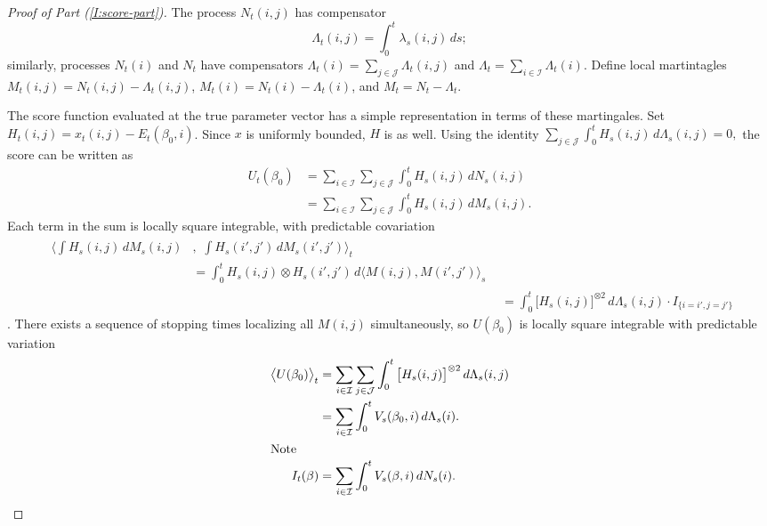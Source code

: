 \documentclass[aoas,preprint]{imsart}
\begin{document}
\begin{proof}[Proof of Part \textit{(\ref{I:score-part})}]
The process $N_t(i,j)$ has compensator
\begin{equation}
    \Lambda_t(i,j)
        =
            \int_0^t \lambda_s(i,j) \, ds;
\end{equation}
similarly, processes $N_t(i)$ and $N_t$ have compensators
$\Lambda_t(i) = \sum_{j \in \mathcal{J}} \Lambda_t(i,j)$
and $\Lambda_t = \sum_{i \in \mathcal{I}} \Lambda_t(i)$.  Define local
martintagles $M_t(i,j) = N_t(i,j) - \Lambda_t(i,j)$,
$M_t(i) = N_t(i) - \Lambda_t(i)$, and 
$M_t = N_t - \Lambda_t$.  

The score function evaluated at the true parameter vector has a simple
representation in terms of these martingales.  Set
$H_t(i,j) = x_t(i,j) - E_t(\beta_0,i)$.  Since $x$ is uniformly
bounded, $H$ is as well.  Using the identity
\(
    \sum_{j \in \mathcal{J}}
    \int_0^t
        H_s(i,j) \,
        d\Lambda_s(i,j)
    =
    0,
\)
the score can be written as
\begin{align*}
    U_t(\beta_0)
        &=
        \sum_{i \in \mathcal{I}}
        \sum_{j \in \mathcal{J}}
        \int_0^t
            H_s(i,j) \, dN_s(i,j) \\
        &=
        \sum_{i \in \mathcal{I}}
        \sum_{j \in \mathcal{J}}
        \int_0^t
            H_s(i,j) \, dM_s(i,j).
\end{align*}
Each term in the sum is locally square integrable, with predictable
covariation
\begin{align*}
    \begin{split}
        \bigg\langle
            \int
                H_s(i,j) \, dM_s(i,j)
        &, \, \,
            \int
                H_s(i',j') \, dM_s(i',j')
        \bigg\rangle_t \\
        &=
            \int_0^t
                H_s(i,j) \otimes H_s(i',j') \,
                d\big\langle M(i,j), M(i',j')\big\rangle_s
    \end{split} \\
        &=
            \int_0^t
                \big[ H_s(i,j) \big]^{\otimes 2} \,
                d\Lambda_s(i,j)
            \cdot
            I_{\{ i = i', j = j' \}}
\end{align*}
\cite[Thm.~2.4.3]{fleming1991counting}.  There exists a sequence
of stopping times localizing all $M(i,j)$ simultaneously, so $U(\beta_0)$ is
locally square integrable with predictable variation
\begin{align*}
    \big\langle U(\beta_0) \big\rangle_t
        &=
            \sum_{i \in \mathcal{I}}
            \sum_{j \in \mathcal{J}}
            \int_0^t
                \big[ H_s(i,j) \big]^{\otimes 2} \,
                d\Lambda_s(i,j) \\
        &=
            \sum_{i \in \mathcal{I}}
            \int_0^t
                V_s(\beta_0, i) \,
                d\Lambda_s(i). \\
\intertext{Note}
    I_t(\beta)
        &=
            \sum_{i \in \mathcal{I}}
            \int_0^t
                V_s(\beta, i) \,
                dN_s(i).
\end{align*}


\end{proof}
\end{document}
